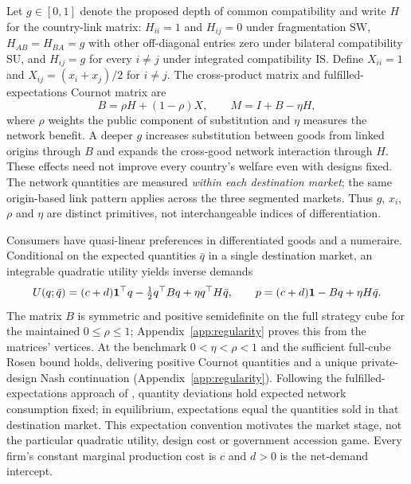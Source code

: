 \documentclass[11pt,a4paper]{article}
\theoremstyle{remark}\newtheorem{remark}[theorem]{Remark}
\newcommand{\SW}{\mathrm{SW}}\newcommand{\SU}{\mathrm{SU}}\newcommand{\IS}{\mathrm{IS}}
\begin{document}
Let $g\in[0,1]$ denote the proposed depth of common compatibility and write $H$ for the country-link matrix: $H_{ii}=1$ and $H_{ij}=0$ under fragmentation $\SW$, $H_{AB}=H_{BA}=g$ with other off-diagonal entries zero under bilateral compatibility $\SU$, and $H_{ij}=g$ for every $i\ne j$ under integrated compatibility $\IS$. Define $X_{ii}=1$ and $X_{ij}=(x_i+x_j)/2$ for $i\ne j$. The cross-product matrix and fulfilled-expectations Cournot matrix are
\begin{equation}\label{eq:matrices}
B=\rho H+(1-\rho)X,\qquad M=I+B-\eta H,
\end{equation}
where $\rho$ weights the public component of substitution and $\eta$ measures the network benefit. A deeper $g$ increases substitution between goods from linked origins through $B$ and expands the cross-good network interaction through $H$. These effects need not improve every country's welfare even with designs fixed. The network quantities are measured \emph{within each destination market}; the same origin-based link pattern applies across the three segmented markets. Thus $g$, $x_i$, $\rho$ and $\eta$ are distinct primitives, not interchangeable indices of differentiation.

Consumers have quasi-linear preferences in differentiated goods and a numeraire. Conditional on the expected quantities $\bar q$ in a single destination market, an integrable quadratic utility yields inverse demands
\begin{equation}\label{eq:consumer}
U(q;\bar q)=(c+d)\boldsymbol{1}^{\top}q-\tfrac12q^{\top}Bq+\eta q^{\top}H\bar q,\qquad
p=(c+d)\boldsymbol{1}-Bq+\eta H\bar q.
\end{equation}
The matrix $B$ is symmetric and positive semidefinite on the full strategy cube for the maintained $0\le\rho\le1$; Appendix~\ref{app:regularity} proves this from the matrices' vertices. At the benchmark $0<\eta<\rho<1$ and the sufficient full-cube Rosen bound holds, delivering positive Cournot quantities and a unique private-design Nash continuation (Appendix~\ref{app:regularity}). Following the fulfilled-expectations approach of \citet{KatzShapiro1985}, quantity deviations hold expected network consumption fixed; in equilibrium, expectations equal the quantities sold in that destination market. This expectation convention motivates the market stage, not the particular quadratic utility, design cost or government accession game. Every firm's constant marginal production cost is $c$ and $d>0$ is the net-demand intercept.
\end{document}
